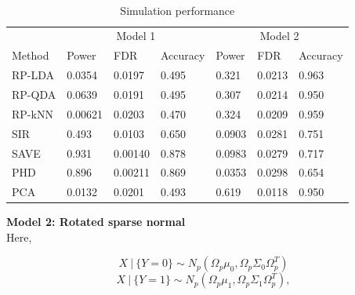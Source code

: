 \documentclass[12pt]{article}
\begin{document}
~\\

\begin{table}
  \caption{Simulation performance}
  \label{sample-table}
  \centering
  \begin{tabular}{l|lll|lll}
    \toprule
    & \multicolumn{3}{c}{Model 1} & \multicolumn{3}{c}{Model 2}                     \\
    \cmidrule(r){1-7}
    Method     & Power     & FDR & Accuracy &  Power     & FDR & Accuracy   \\
   
    \midrule
    RP-LDA & 0.0354 & 0.0197  &  0.495 & 0.321 &   0.0213 & 0.963 \\
    RP-QDA & 0.0639  & 0.0191 & 0.495 & 0.307 &    0.0214 & 0.950 \\
    RP-kNN & 0.00621  & 0.0203 & 0.470 & 0.324 &   0.0209 & 0.959 \\
    SIR & 0.493 &  0.0103 & 0.650 &  0.0903 &      0.0281 & 0.751 \\
    SAVE & 0.931 & 0.00140 & 0.878 & 0.0983 &      0.0279 & 0.717 \\
    PHD & 0.896 & 0.00211 & 0.869 & 0.0353 &       0.0298 & 0.654 \\
    PCA & 0.0132 & 0.0201 & 0.493 & 0.619 &        0.0118 & 0.950 \\
    \bottomrule
  \end{tabular}
\end{table}




\noindent\textbf{Model 2: Rotated sparse normal}\\
Here,

\[X \ | \ \{Y = 0\} \sim N_p(\Omega_p\mu_0, \Omega_p \Sigma_0 \Omega_p^T)  \] 
\[X \ | \ \{Y = 1\} \sim N_p(\Omega_p\mu_1, \Omega_p\Sigma_1\Omega_p^T),  \]
\end{document}

